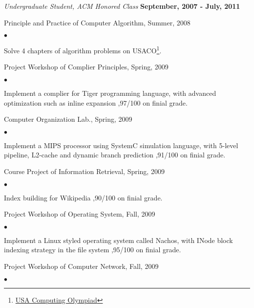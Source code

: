 \documentclass[margin,line]{res}
\newenvironment{list1}{
  \begin{list}{\ding{113}}{%
      \setlength{\itemsep}{0in}
      \setlength{\parsep}{0in} \setlength{\parskip}{0in}
      \setlength{\topsep}{0in} \setlength{\partopsep}{0in} 
      \setlength{\leftmargin}{0.17in}}}{\end{list}}
\newenvironment{list2}{
  \begin{list}{$\bullet$}{%
      \setlength{\itemsep}{0in}
      \setlength{\parsep}{0in} \setlength{\parskip}{0in}
      \setlength{\topsep}{0in} \setlength{\partopsep}{0in} 
      \setlength{\leftmargin}{0.2in}}}{\end{list}}
\begin{document}
\begin{resume}
{\em Undergraduate Student, ACM Honored Class} \hfill {\bf September, 2007 - July, 2011}\\
\vspace*{-.1in}
\begin{list1}
\item[] Principle and Practice of Computer Algorithm, Summer, 2008 
  \begin{list2}
	\vspace*{.05in}
  \item Solve 4 chapters of algorithm problems on USACO\footnote {\href{http://train.usaco.org/usacogate}{USA Computing Olympiad}}. 
\end{list2}
\item[] Project Workshop of Complier Principles, Spring, 2009 
  \begin{list2}
	\vspace*{.05in}
\item Implement a complier for Tiger programming language, with advanced optimization such as inline expansion
,97/100 on finial grade. 
\end{list2}
\item[] Computer Organization Lab., Spring, 2009
  \begin{list2}
	\vspace*{.05in}
  \item Implement a MIPS processor using SystemC simulation language, with 5-level pipeline, L2-cache and dynamic branch prediction
,91/100 on finial grade.
  \end{list2}
\item[] Course Project of Information Retrieval, Spring, 2009
  \begin{list2}
	\vspace*{.05in}
  \item Index building for Wikipedia 
,90/100 on finial grade.
  \end{list2}
\item[] Project Workshop of Operating System, Fall, 2009
  \begin{list2}
	\vspace*{.05in}
  \item Implement a Linux styled operating system called Nachos, with INode block indexing strategy in the file system 
,95/100 on finial grade.
  \end{list2}
\item[] Project Workshop of Computer Network, Fall, 2009
  \begin{list2}
	\vspace*{.05in}

\end{list2}
\end{list1}
\end{resume}
\end{document}

